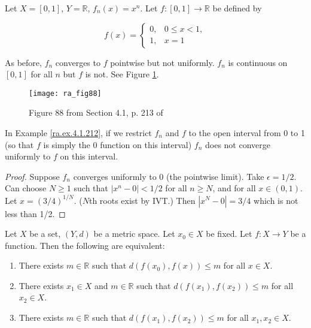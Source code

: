 \begin{example}\label{ra.ex.4.1.212}

Let \(X = [0,1]\), \(Y = \mathbb{R}\), \(f_n(x) = x^n\). Let \(f:[0,1] \to \mathbb{R}\) be defined by 

\[
f(x) = \begin{cases}
0, & 0 \leq x < 1, \\
1, & x=1
\end{cases}
\]

As before, \(f_n\) converges to \(f\) pointwise but not uniformly. \(f_n\) is continuous on \([0,1]\) for all \(n\) but \(f\) is not. See Figure \ref{ra.fig.88}.

\begin{figure}[htbp]
\begin{center}
\texttt{[image: ra\_fig88]}
\caption{Figure 88 from Section 4.1, p. 213 of \citet{pugh2015real}}
\label{ra.fig.88}
\end{center}
\end{figure}


\end{example}

\begin{proposition} In Example \ref{ra.ex.4.1.212}, if we restrict \(f_n\) and \(f\) to the open interval from 0 to 1 (so that \(f\) is simply the 0 function on this interval) \(f_n\) does not converge uniformly to \(f\) on this interval.

\end{proposition}

\begin{proof}

Suppose \(f_n\) converges uniformly to 0 (the pointwise limit). Take \(\epsilon = 1/2\). Can choose \(N \geq 1\) such that  \(|x^n - 0 | < 1/2\) for all \(n \geq N\), and for all \(x \in (0,1)\). Let \(x = (3/4)^{1/N}\). (\(N\)th roots exist by IVT.) Then \(|x^N - 0| = 3/4 \) which is not less than 1/2. 

\end{proof}

\begin{exercise}\label{ra.425b.bounded}

Let \(X\) be a set, \((Y, d)\) be a metric space. Let \(x_0 \in X\) be fixed. Let \(f: X \to Y\) be a function. Then the following are equivalent:

\begin{enumerate}

\item There exists \(m \in \mathbb{R}\) such that \(d(f(x_0), f(x)) \leq m\) for all \(x \in X\). 

\item There exists \(x_1 \in X\) and \(m \in \mathbb{R}\) such that \(d(f(x_1), f(x_2)) \leq m\) for all \(x_2 \in X\).

\item There exists \(m \in \mathbb{R}\) such that \(d(f(x_1), f(x_2)) \leq m\) for all \(x_1, x_2 \in  X\). 

\end{enumerate}

\end{exercise}

